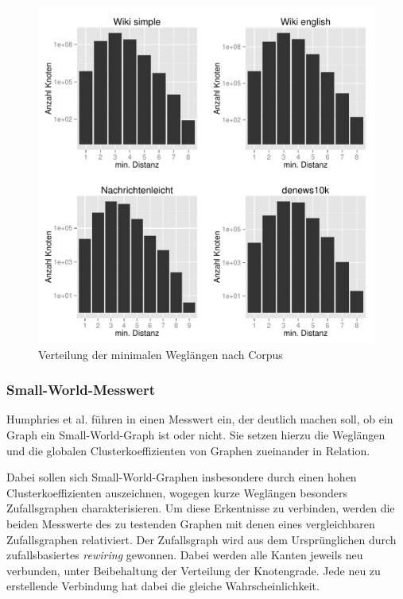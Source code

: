 \documentclass[11pt, a4paper]{article}
\begin{document}
\begin{figure}[ht]
    \centering
        \includegraphics[scale=.75]{mdh_plots.pdf}
    \caption{Verteilung der minimalen Weglängen nach Corpus}
    \label{fig-mdh}
\end{figure}


\subsubsection{Small-World-Messwert}

Humphries et al. führen in \cite{Humphries2006} einen Messwert ein, der deutlich
machen soll, ob ein Graph ein Small-World-Graph ist oder nicht. Sie setzen hierzu
die Weglängen und die globalen Clusterkoeffizienten von Graphen zueinander in 
Relation.

Dabei sollen sich Small-World-Graphen insbesondere durch einen hohen
 Clusterkoeffizienten auszeichnen, wogegen kurze Weglängen besonders
 Zufallsgraphen charakterisieren. Um diese Erkentnisse zu verbinden, werden die
 beiden Messwerte des zu testenden Graphen mit denen eines vergleichbaren
 Zufallsgraphen relativiert. Der Zufallsgraph wird aus dem Ursprünglichen durch
 zufallsbasiertes \emph{rewiring} gewonnen.
Dabei werden alle Kanten jeweils neu verbunden, unter Beibehaltung der Verteilung
der Knotengrade.
Jede neu zu erstellende Verbindung hat dabei die gleiche Wahrscheinlichkeit.
\end{document}
